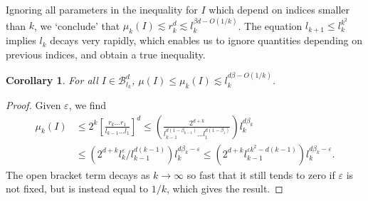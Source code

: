 \documentclass[usenames,dvipsnames]{article}
\theoremstyle{plain}
\newtheorem{corollary}{Corollary}
\theoremstyle{plain}
\begin{document}
Ignoring all parameters in the inequality for $I$ which depend on indices smaller than $k$, we `conclude' that $\mu_k(I) \lesssim r_k^d \lesssim l_k^{\beta d - O(1/k)}$. The equation $l_{k+1} \leq l_k^{k^2}$ implies $l_k$ decays very rapidly, which enables us to ignore quantities depending on previous indices, and obtain a true inequality.

\begin{corollary}
	For all $I \in \mathcal{B}^d_{l_k}$, $\mu(I) \leq \mu_k(I) \lesssim l_k^{d \beta - O(1/k)}$.
\end{corollary}
\begin{proof}
	Given $\varepsilon$, we find
	\begin{align*}
		\mu_k(I) &\leq 2^k \left[ \frac{r_k \dots r_1}{l_{k-1} \dots l_1} \right]^d \leq \left( \frac{2^{d + k}}{l_{k-1}^{d(1 - \beta_{k-1})} \dots l_1^{d(1 - \beta_1)}} \right) l_k^{d \beta_k}\\
		&\leq \left( 2^{d + k} l_k^\varepsilon / l_{k-1}^{d(k-1)} \right) l_k^{d \beta_k - \varepsilon} \leq \left( 2^{d + k} l_{k-1}^{\varepsilon k^2 - d(k - 1)} \right) l_k^{d \beta_k - \varepsilon}.
	\end{align*}
	The open bracket term decays as $k \to \infty$ so fast that it still tends to zero if $\varepsilon$ is not fixed, but is instead equal to $1/k$, which gives the result.
\end{proof}


\end{document}
